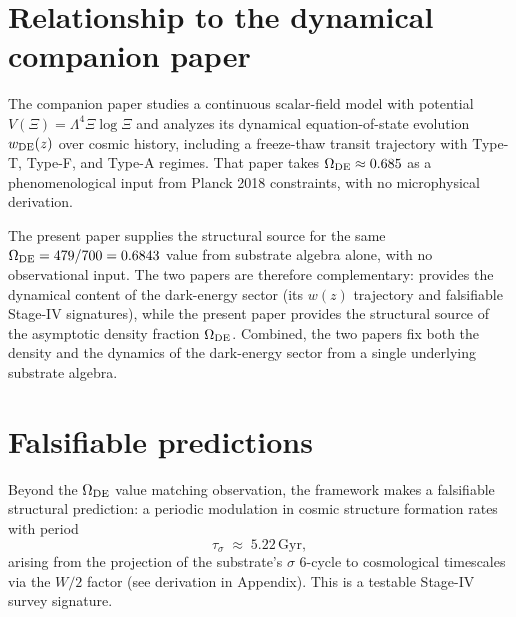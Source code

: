 \documentclass[11pt,reqno]{amsart}
\theoremstyle{plain}
\theoremstyle{definition}
\theoremstyle{remark}
\newcommand{\OmegaDE}{\Omega_{\rm DE}}
\begin{document}
\section{Relationship to the dynamical companion paper}\label{sec:companion}


The companion paper \cite{SandersGishLogQuint2026} studies a
continuous scalar-field model with potential $V(\Xi) = \Lambda^4 \Xi
\log\Xi$ and analyzes its dynamical equation-of-state evolution
$w_{\rm DE}(z)$ over cosmic history, including a freeze-thaw transit
trajectory with Type-T, Type-F, and Type-A regimes. That paper takes
$\OmegaDE \approx 0.685$ as a phenomenological input from Planck 2018
constraints, with no microphysical derivation.

The present paper supplies the structural source for the same
$\OmegaDE = 479/700 = 0.6843$ value from substrate algebra alone,
with no observational input. The two papers are therefore
complementary: \cite{SandersGishLogQuint2026} provides the dynamical
content of the dark-energy sector (its $w(z)$ trajectory and
falsifiable Stage-IV signatures), while the present paper provides
the structural source of the asymptotic density fraction $\OmegaDE$.
Combined, the two papers fix both the density and the dynamics of
the dark-energy sector from a single underlying substrate algebra.

\section{Falsifiable predictions}\label{sec:falsification}


Beyond the $\OmegaDE$ value matching observation, the framework makes
a falsifiable structural prediction: a periodic modulation in cosmic
structure formation rates with period
\begin{equation}\label{eq:tau-sigma}
\tau_\sigma \;\approx\; 5.22 \,\textrm{Gyr},
\end{equation}
arising from the projection of the substrate's $\sigma$ $6$-cycle to
cosmological timescales via the $W/2$ factor (see derivation in
Appendix). This is a testable Stage-IV survey signature.
\end{document}
